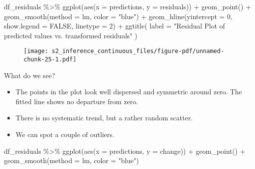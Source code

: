 \documentclass[
  letterpaper,
  DIV=11,
  numbers=noendperiod]{scrreprt}
\newenvironment{Shaded}{\begin{snugshade}}{\end{snugshade}}
\newcommand{\AttributeTok}[1]{\textcolor[rgb]{0.40,0.45,0.13}{#1}}
\newcommand{\ConstantTok}[1]{\textcolor[rgb]{0.56,0.35,0.01}{#1}}
\newcommand{\DecValTok}[1]{\textcolor[rgb]{0.68,0.00,0.00}{#1}}
\newcommand{\FunctionTok}[1]{\textcolor[rgb]{0.28,0.35,0.67}{#1}}
\newcommand{\NormalTok}[1]{\textcolor[rgb]{0.00,0.23,0.31}{#1}}
\newcommand{\SpecialCharTok}[1]{\textcolor[rgb]{0.37,0.37,0.37}{#1}}
\newcommand{\StringTok}[1]{\textcolor[rgb]{0.13,0.47,0.30}{#1}}
\begin{document}
\begin{Shaded}
\begin{Highlighting}[]
\NormalTok{df\_residuals }\SpecialCharTok{\%\textgreater{}\%} 
  \FunctionTok{ggplot}\NormalTok{(}\FunctionTok{aes}\NormalTok{(}\AttributeTok{x =}\NormalTok{ predictions, }\AttributeTok{y =}\NormalTok{ residuals)) }\SpecialCharTok{+}
  \FunctionTok{geom\_point}\NormalTok{() }\SpecialCharTok{+}
  \FunctionTok{geom\_smooth}\NormalTok{(}\AttributeTok{method =}\NormalTok{ lm, }\AttributeTok{color =} \StringTok{"blue"}\NormalTok{) }\SpecialCharTok{+}
  \FunctionTok{geom\_hline}\NormalTok{(}\AttributeTok{yintercept =} \DecValTok{0}\NormalTok{, }\AttributeTok{show.legend =} \ConstantTok{FALSE}\NormalTok{, }\AttributeTok{linetype =} \DecValTok{2}\NormalTok{) }\SpecialCharTok{+}
  \FunctionTok{ggtitle}\NormalTok{(}
    \AttributeTok{label =} \StringTok{"Residual Plot of predicted values vs. transformed residuals"}
\NormalTok{  )}
\end{Highlighting}
\end{Shaded}

\begin{figure}[H]

{\centering \texttt{[image: s2\_inference\_continuous\_files/figure-pdf/unnamed-chunk-25-1.pdf]}

}

\end{figure}

What do we see?

\begin{itemize}
\item
  The points in the plot look well dispersed and symmetric around zero.
  The fitted line shows no departure from zero.
\item
  There is no systematic trend, but a rather random scatter.
\item
  We can spot a couple of outliers.
\end{itemize}

\begin{Shaded}
\begin{Highlighting}[]
\NormalTok{df\_residuals }\SpecialCharTok{\%\textgreater{}\%} 
  \FunctionTok{ggplot}\NormalTok{(}\FunctionTok{aes}\NormalTok{(}\AttributeTok{x =}\NormalTok{ predictions, }\AttributeTok{y =}\NormalTok{ change)) }\SpecialCharTok{+}
  \FunctionTok{geom\_point}\NormalTok{() }\SpecialCharTok{+}
  \FunctionTok{geom\_smooth}\NormalTok{(}\AttributeTok{method =}\NormalTok{ lm, }\AttributeTok{color =} \StringTok{"blue"}\NormalTok{)}
\end{Highlighting}
\end{Shaded}
\end{document}
